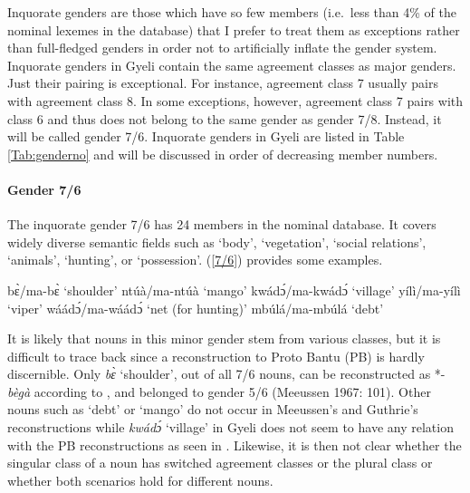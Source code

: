 Inquorate genders are those which have so few members (i.e.\ less than 4\% of the nominal lexemes in the database) that I prefer to treat them as exceptions rather than full-fledged genders in order not to artificially inflate the gender system. Inquorate genders in Gyeli contain the same  agreement classes as major genders. Just their pairing is exceptional. For instance, agreement class 7 usually pairs with agreement class 8. In some exceptions, however, agreement class 7 pairs with class 6 and thus does not belong to the same gender as gender 7/8. Instead, it will be called gender 7/6. Inquorate genders in Gyeli are listed in Table \ref{Tab:genderno}  and will be discussed in order of decreasing member numbers. 

\paragraph{Gender 7/6}

The inquorate gender 7/6 has 24 members in the nominal database. It covers widely diverse semantic fields such as `body', `vegetation', `social relations', `animals', `hunting', or `possession'. (\ref{7/6}) provides some examples.


\begin{exe}
\ex\label{7/6}
\begin{xlist}
\ex bɛ̀/ma-bɛ̀ `shoulder'
\ex ntúà/ma-ntúà `mango'
\ex kwádɔ́/ma-kwádɔ́ `village'
\ex yílì/ma-yílì `viper'
\ex wáádɔ́/ma-wáádɔ́ `net (for hunting)'
\ex mbúlá/ma-mbúlá `debt'
\end{xlist}
\end{exe}

\noindent It is likely that nouns in this minor gender stem from various classes, but it is difficult to trace back since a reconstruction to Proto Bantu (PB) is hardly discernible. Only  {\itshape bɛ̀} `shoulder', out of all 7/6 nouns, can be reconstructed as *-{\itshape bègà} according to \citet[154]{guthrie67}, and belonged to gender 5/6 (Meeussen 1967: 101).%
Other nouns such as `debt' or `mango' do not occur in Meeussen's and Guthrie's reconstructions while  {\itshape kwádɔ́} `village' in Gyeli does not seem to have any relation with the PB reconstructions as seen in \citet[27]{guthrie71}. Likewise, it is then not clear whether the singular class of a noun has switched agreement classes or the plural class or whether both scenarios hold for different nouns. 

